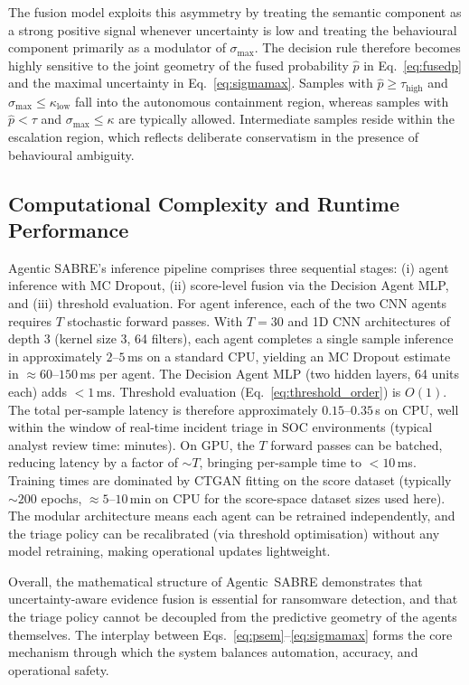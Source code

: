 \documentclass[lettersize,journal]{IEEEtran}
\begin{document}
The fusion model exploits this asymmetry by treating the semantic component as a strong positive signal whenever uncertainty is low and treating the behavioural component primarily as a modulator of \(\sigma_{\max}\). The decision rule therefore becomes highly sensitive to the joint geometry of the fused probability \(\hat{p}\) in Eq.~\eqref{eq:fusedp} and the maximal uncertainty in Eq.~\eqref{eq:sigmamax}. Samples with \(\hat{p} \ge \tau_{\mathrm{high}}\) and \(\sigma_{\max} \le \kappa_{\mathrm{low}}\) fall into the autonomous containment region, whereas samples with \(\hat{p} < \tau\) and \(\sigma_{\max} \le \kappa\) are typically allowed. Intermediate samples reside within the escalation region, which reflects deliberate conservatism in the presence of behavioural ambiguity.

\subsection*{Computational Complexity and Runtime Performance}

Agentic SABRE's inference pipeline comprises three sequential stages: (i) agent inference
with MC Dropout, (ii) score-level fusion via the Decision Agent MLP, and (iii) threshold
evaluation. For agent inference, each of the two CNN agents requires $T$ stochastic forward
passes. With $T = 30$ and 1D CNN architectures of depth 3 (kernel size 3, 64 filters), each
agent completes a single sample inference in approximately $2$--$5$\,ms on a standard CPU,
yielding an MC Dropout estimate in $\approx 60$--$150$\,ms per agent. The Decision Agent
MLP (two hidden layers, 64 units each) adds $< 1$\,ms. Threshold evaluation
(Eq.~\ref{eq:threshold_order}) is $O(1)$. The total per-sample latency is therefore
approximately $0.15$--$0.35$\,s on CPU, well within the window of real-time incident triage
in SOC environments (typical analyst review time: minutes). On GPU, the $T$ forward passes
can be batched, reducing latency by a factor of $\sim T$, bringing per-sample time to
$<10$\,ms. Training times are dominated by CTGAN fitting on the score dataset (typically
$\sim 200$ epochs, $\approx 5$--$10$\,min on CPU for the score-space dataset sizes used
here). The modular architecture means each agent can be retrained independently, and the
triage policy can be recalibrated (via threshold optimisation) without any model retraining,
making operational updates lightweight.

Overall, the mathematical structure of Agentic~SABRE demonstrates that uncertainty-aware evidence fusion is essential for ransomware detection, and that the triage policy cannot be decoupled from the predictive geometry of the agents themselves. The interplay between Eqs.~\eqref{eq:psem}--\eqref{eq:sigmamax} forms the core mechanism through which the system balances automation, accuracy, and operational safety.
\end{document}
